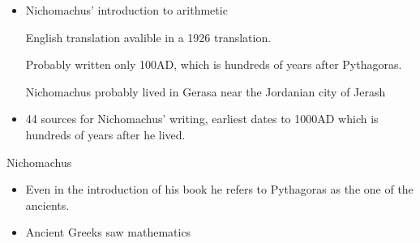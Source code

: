 \documentclass{report}
\begin{document}
\begin{description}
\begin{mdframed}
\begin{itemize}
\begin{itemize}
\begin{mdframed}
                                \begin{itemize}
                                    \item Nichomachus' introduction
                                        to arithmetic
                                        \begin{mdframed}
                                            English translation
                                            avalible in a 1926
                                             translation.
                                        \end{mdframed}
                                        \begin{mdframed}
                                            Probably written
                                            only 100AD, which
                                            is hundreds of years
                                            after Pythagoras.
                                        \end{mdframed}
                                        \begin{mdframed}
                                            Nichomachus probably
                                            lived in Gerasa near
                                            the Jordanian city of
                                            Jerash
                                        \end{mdframed}
                                    \item 44 sources for Nichomachus'
                                        writing, earliest dates
                                        to 1000AD which is hundreds
                                        of years after he lived.
                                \end{itemize}
                            \end{mdframed}
                    \end{itemize}
            \end{itemize}
        \end{mdframed}
    \item Nichomachus
        \begin{mdframed}
            \begin{itemize}
                \item Even in the introduction of his
                    book he refers to Pythagoras as the
                    one of the ancients.
                \item Ancient Greeks saw mathematics

\end{itemize}
\end{mdframed}
\end{description}
\end{document}

